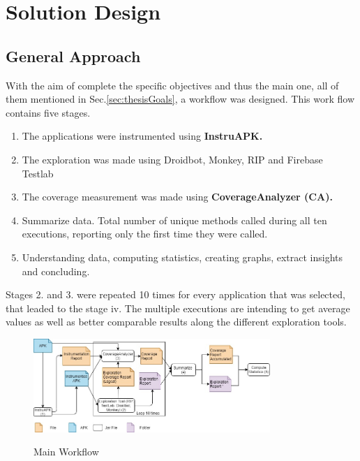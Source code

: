 
\chapter{Solution Design} %

\label{Chapter4} %

\section{General Approach} \label{sec:generalApproach}

With the aim of complete the specific objectives and thus the main one, all of them mentioned in Sec.\ref{sec:thesisGoals}, a workflow was designed. This work flow contains five stages.

\begin{enumerate}
	\item The applications were instrumented using \textbf{InstruAPK.}
	\item The exploration was made using Droidbot, Monkey, RIP and Firebase Testlab
	\item The coverage measurement was made using \textbf{CoverageAnalyzer (CA).}
	\item Summarize data. Total number of unique methods called during all ten executions, reporting only the first time they were called.
	\item Understanding data, computing statistics, creating graphs, extract insights and concluding.
\end{enumerate}

Stages 2. and 3. were repeated 10 times for every application that was selected, that leaded to the stage iv. The multiple executions are intending to get average values as well as better comparable results along the different exploration tools.

\begin{figure}[h]
\centering
\includegraphics[width=0.8\textwidth]{../Figures/workflow.jpg}
\label{fig:workflow}
\caption{Main Workflow}
\end{figure}


